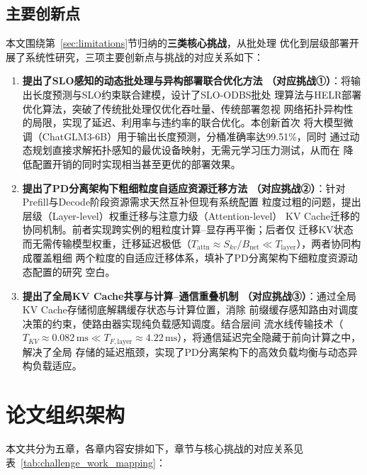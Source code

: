 \subsection{主要创新点}

本文围绕第~\ref{sec:limitations}节归纳的\textbf{三类核心挑战}，从批处理
优化到层级部署开展了系统性研究，三项主要创新点与挑战的对应关系如下：

\begin{enumerate}

\item \textbf{提出了SLO感知的动态批处理与异构部署联合优化方法
（对应挑战①）}：将输出长度预测与SLO约束联合建模，设计了SLO-ODBS批处
理算法与HELR部署优化算法，突破了传统批处理仅优化吞吐量、传统部署忽视
网络拓扑异构性的局限，实现了延迟、利用率与违约率的联合优化。本创新首次
将大模型微调（ChatGLM3-6B）用于输出长度预测，分桶准确率达99.51\%，同时
通过动态规划直接求解拓扑感知的最优设备映射，无需元学习压力测试，从而在
降低配置开销的同时实现相当甚至更优的部署效果。

\item \textbf{提出了PD分离架构下粗细粒度自适应资源迁移方法
（对应挑战②）}：针对Prefill与Decode阶段资源需求天然互补但现有系统配置
粒度过粗的问题，提出层级（Layer-level）权重迁移与注意力级（Attention-level）
KV Cache迁移的协同机制。前者实现跨实例的粗粒度计算--显存再平衡；后者仅
迁移KV状态而无需传输模型权重，迁移延迟极低（$T_{\mathrm{attn}} \approx
S_{kv}/B_{\mathrm{net}} \ll T_{\mathrm{layer}}$），两者协同构成覆盖粗细
两个粒度的自适应迁移体系，填补了PD分离架构下细粒度资源动态配置的研究
空白。

\item \textbf{提出了全局KV Cache共享与计算--通信重叠机制
（对应挑战③）}：通过全局KV Cache存储彻底解耦缓存状态与计算位置，消除
前缀缓存感知路由对调度决策的约束，使路由器实现纯负载感知调度。结合层间
流水线传输技术（$T_{KV} \approx 0.082\,\text{ms} \ll T_{F,\text{layer}}
\approx 4.22\,\text{ms}$），将通信延迟完全隐藏于前向计算之中，解决了全局
存储的延迟瓶颈，实现了PD分离架构下的高效负载均衡与动态异构负载适应。

\end{enumerate}

\section{论文组织架构}

本文共分为五章，各章内容安排如下，章节与核心挑战的对应关系见
表~\ref{tab:challenge_work_mapping}：

